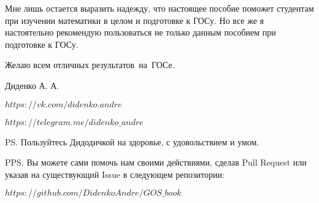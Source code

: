 Мне лишь остается выразить надежду, что настоящее пособие поможет студентам при изучении математики в целом и подготовке к ГОСу. Но все же я настоятельно рекомендую пользоваться не только данным пособием при подготовке к ГОСу.
\vspace*{\baselineskip}

\mbox{}

Желаю всем отличных результатов~на~ГОСе.

\mbox{}

\noindent Диденко А. А.

\noindent\href{https://vk.com/didenko.andre}{$https://vk.com/didenko.andre$}

\noindent\href{https://telegram.me/didenko_andre}{$https://telegram.me/didenko\_andre$}

\mbox{}

\noindent PS. Пользуйтесь Дидодичкой на здоровье, с удовольствием и умом. \smiley

\mbox{}

\noindent PPS. Вы можете сами помочь нам своими действиями, сделав Pull Request или указав на существующий Issue в следующем репозитории:

\noindent\href{https://github.com/DidenkoAndre/GOS_book}{$https://github.com/DidenkoAndre/GOS\_book$}